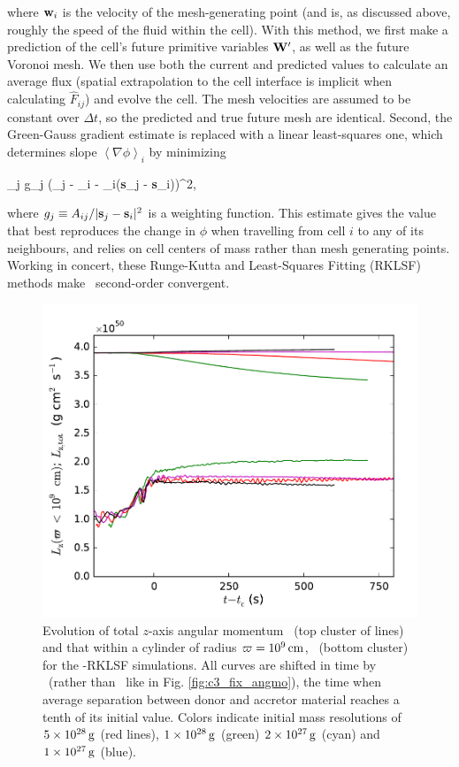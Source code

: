 \noindent where ${\bf w}_i$ is the velocity of the mesh-generating point (and is, as discussed above, roughly the speed of the fluid within the cell).  With this method, we first make a prediction of the cell's future primitive variables ${\bf W}^\prime$, as well as the future Voronoi mesh.  We then use both the current and predicted values to calculate an average flux (spatial extrapolation to the cell interface is implicit when calculating $\hat{F}_{ij}$) and evolve the cell.  The mesh velocities are assumed to be constant over $\Delta t$, so the predicted and true future mesh are identical.  Second, the Green-Gauss gradient estimate is replaced with a linear least-squares one, which determines slope $\left\langle \nabla \phi \right\rangle_i$ by minimizing

\eqbegin
\sum_j g_j \left(\phi_j - \phi_i - \left\langle \nabla \phi \right\rangle_i({\bf s}_j - {\bf s}_i)\right)^2,
\label{eq:c3_leastsq_grad}
\eqend

\noindent where $g_j \equiv A_{ij}/|{\bf s}_j - {\bf s}_i|^2$ is a weighting function.  This estimate gives the value that best reproduces the change in $\phi$ when travelling from cell $i$ to any of its neighbours, and relies on cell centers of mass rather than mesh generating points.  Working in concert, these Runge-Kutta and Least-Squares Fitting (RKLSF) methods make \arepo\ second-order convergent.

\begin{figure}
\centering
\includegraphics[angle=0,width=0.6\columnwidth]{chapter3_zhu+u/figures/lz_development2.pdf}
\caption{Evolution of total $z$-axis angular momentum \Lztot\ (top cluster of lines) and that within a cylinder of radius $\varpi = 10^9\,\mathrm{cm}$, \Lzinner\ (bottom cluster) for the \arepo-RKLSF simulations.  All curves are shifted in time by \tcoal\ (rather than \tlm\ like in Fig. \ref{fig:c3_fix_angmo}), the time when average separation between donor and accretor material reaches a tenth of its initial value.  Colors indicate initial mass resolutions of $5\times10^{28}\,\mathrm{g}$ (red lines), $1\times10^{28}\,\mathrm{g}$ (green) $2\times10^{27}\,\mathrm{g}$ (cyan) and $1\times10^{27}\,\mathrm{g}$ (blue).}
\label{fig:c3_fix_angmo_nar}
\end{figure}

